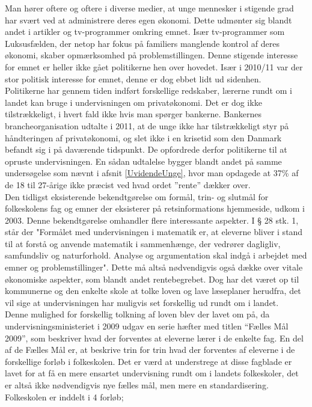 Man hører oftere og oftere i diverse medier, at unge mennesker i stigende grad har svært ved at administrere deres egen økonomi. Dette udmønter sig blandt andet i artikler og tv-programmer omkring emnet. Især tv-programmer som Luksusfælden, der netop har fokus på familiers manglende kontrol af deres økonomi, skaber opmærksomhed på problemstillingen. Denne stigende interesse for emnet er heller ikke gået politikerne hen over hovedet. Især i 2010/11 var der stor politisk interesse for emnet, denne er dog ebbet lidt ud sidenhen.\\

Politikerne har gennem tiden indført forskellige redskaber, lærerne rundt om i landet kan bruge i undervisningen om privatøkonomi. Det er dog ikke tilstrækkeligt, i hvert fald ikke hvis man spørger bankerne. Bankernes brancheorganisation udtalte i 2011, at de unge ikke har tilstrækkeligt styr på håndteringen af privatøkonomi, og slet ikke i en krisetid som den Danmark befandt sig i på daværende tidspunkt. De opfordrede derfor politikerne til at opruste undervisningen. En sådan udtalelse bygger blandt andet på samme undersøgelse som nævnt i afsnit \ref{UvidendeUnge}, hvor man opdagede at 37\% af de 18 til 27-årige ikke præcist ved hvad ordet ”rente” dækker over.\\ %

Den tidligst eksisterende bekendtgørelse om formål, trin- og slutmål for folkeskolens fag og emner der eksisterer på retsinformations hjemmeside, udkom i 2003. Denne bekendtgørelse omhandler flere interessante aspekter. I § 28 stk. 1, står der "Formålet med undervisningen i matematik er, at eleverne bliver i stand til at forstå og anvende matematik i sammenhænge, der vedrører dagligliv, samfundsliv og naturforhold. Analyse og argumentation skal indgå i arbejdet med emner og problemstillinger". Dette må altså nødvendigvis også dække over vitale økonomiske aspekter, som blandt andet rentebegrebet. Dog har det været op til kommunerne og den enkelte skole at tolke loven og lave læseplaner herudfra, det vil sige at undervisningen har muligvis set forskellig ud rundt om i landet.\cite{Bekendtgorelse}\\

Denne mulighed for forskellig tolkning af loven blev der lavet om på, da undervisningsministeriet i 2009 udgav en serie hæfter med titlen “Fælles Mål 2009”, som beskriver hvad der forventes at eleverne lærer i de enkelte fag. En del af de Fælles Mål er, at beskrive trin for trin hvad der forventes af eleverne i de forskellige forløb i folkeskolen. Det er værd at understrege at disse fagblade er lavet for at få en mere ensartet undervisning rundt om i landets folkeskoler, det er altså ikke nødvendigvis nye fælles mål, men mere en standardisering. 
Folkeskolen er inddelt i 4 forløb;

